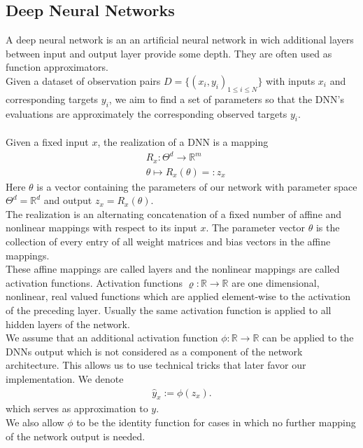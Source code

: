 \documentclass[conference]{IEEEtran}
\begin{document}
	\subsection{Deep Neural Networks}
		\noindent
	A deep neural network is an an artificial neural network in wich additional layers between input and output layer provide some depth. They are often used as function approximators.\\ Given a dataset of observation pairs $D =\{(x_{i}, y_{i})_{1\leq i\leq N}\}$ with inputs ${x_i}$ and corresponding targets $y_i$, we aim to find a set of parameters so that the DNN's evaluations are approximately the corresponding observed targets $y_i$.\\ \ \\  Given a fixed input $x$, the realization
	of a DNN is a mapping
	\begin{align}
	&R_{x}:\Theta^{d}\rightarrow\mathbb{R}^{m}\\
	&\theta\mapsto R_{x}(\theta)=:z_{x}
	\end{align}
	Here $\theta$ is a vector containing the parameters of our network with parameter space $\Theta^{d}=\mathbb{R}^{d}$ and output $z_{x} =R_{x}(\theta)$.\\ The realization is an alternating concatenation of a fixed number of affine and nonlinear mappings with respect to its input $x$. The parameter vector $\theta$ is the collection of every entry of all weight matrices and bias vectors in the affine mappings.\\ These affine mappings are called layers and the nonlinear mappings are called activation functions. Activation functions $\varrho:\mathbb{R}\rightarrow\mathbb{R}$ are one dimensional, nonlinear, real valued functions which are applied element-wise to the activation of the preceding layer. Usually the same activation function is applied to all hidden layers of the network. \\
	We assume that an additional activation function $\phi:\mathbb{R}\rightarrow\mathbb{R}$ can be applied to the DNNs output which is not considered as a component of the network architecture. This allows us to use technical tricks that later favor our implementation.
	We denote
	\begin{align}
	\hat{y}_{x} := \phi(z_{x}).
	\end{align}
	which serves as approximation to $y$.\\
	We also allow $\phi$ to be the identity function for cases in which no further mapping of the network output is needed.
	
\end{document}
